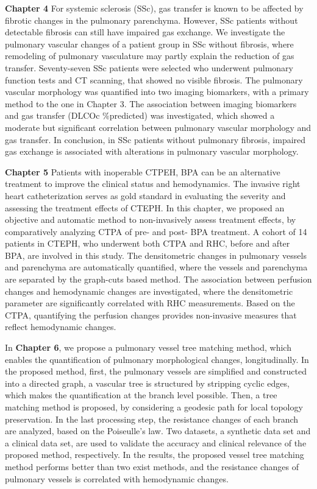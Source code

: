\textbf{Chapter 4} For systemic sclerosis (SSc), gas transfer is known to be affected by fibrotic changes in the pulmonary parenchyma. However, SSc patients without detectable fibrosis can still have impaired gas exchange. We investigate the pulmonary vascular changes of a patient group in SSc without fibrosis, where remodeling of pulmonary vasculature may partly explain the reduction of gas transfer. Seventy-seven SSc patients were selected who underwent pulmonary function tests and CT scanning, that showed no visible fibrosis. The pulmonary vascular morphology was quantified into two imaging biomarkers, with a primary method to the one in Chapter 3. The association between imaging biomarkers and gas transfer (DLCOc \%predicted) was investigated, which showed a moderate but significant correlation between pulmonary vascular morphology and gas transfer. In conclusion, in SSc patients without pulmonary fibrosis, impaired gas exchange is associated with alterations in pulmonary vascular morphology. 

\textbf{Chapter 5} Patients with inoperable CTPEH, BPA can be an alternative treatment to improve the clinical status and hemodynamics. The invasive right heart catheterization serves as gold standard in evaluating the severity and assessing the treatment effects of CTEPH. In this chapter, we proposed an objective and automatic method to non-invasively assess treatment effects, by comparatively analyzing CTPA of pre- and post- BPA treatment. A cohort of 14 patients in CTEPH, who underwent both CTPA and RHC, before and after BPA, are involved in this study. The densitometric changes in pulmonary vessels and parenchyma are automatically quantified, where the vessels and parenchyma are separated by the graph-cuts based method. The association between perfusion changes and hemodynamic changes are investigated, where the densitometric parameter are significantly correlated with RHC measurements. Based on the CTPA, quantifying the perfusion changes provides non-invasive measures that reflect hemodynamic changes.

In \textbf{Chapter 6}, we propose a pulmonary vessel tree matching method, which enables the quantification of pulmonary morphological changes, longitudinally. In the proposed method, first, the pulmonary vessels are simplified and constructed into a directed graph, a vascular tree is structured by stripping cyclic edges, which makes the quantification at the branch level possible. Then, a tree matching method is proposed, by considering a geodesic path for local topology preservation. In the last processing step, the resistance changes of each branch are analyzed, based on the Poiseulle’s law. Two datasets, a synthetic data set and a clinical data set, are used to validate the accuracy and clinical relevance of the proposed method, respectively. In the results, the proposed vessel tree matching method performs better than two exist methods, and the resistance changes of pulmonary vessels is correlated with hemodynamic changes.

